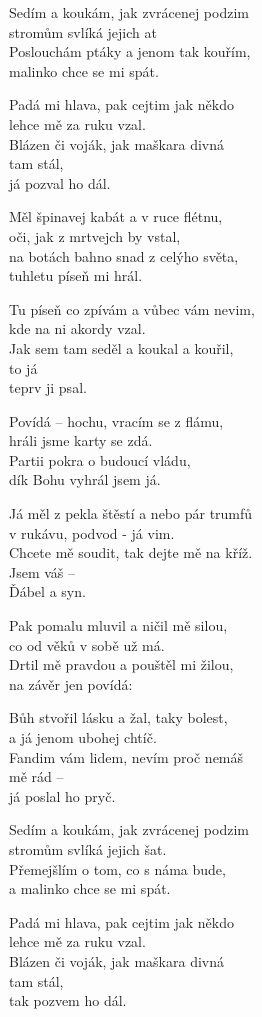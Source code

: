 
\ve{}
Sedím a koukám, jak zvrácenej podzim\\
stromům svlíká jejich at\\
Poslouchám ptáky a jenom tak kouřím,\\
malinko chce se mi spát.

\ve{}
Padá mi hlava, pak cejtim jak někdo\\
lehce mě za ruku vzal.\\
Blázen či voják, jak maškara divná\\
tam stál,\\
já pozval ho dál.

\ve{}
Měl špinavej kabát a v ruce flétnu,\\
oči, jak z mrtvejch by vstal,\\
na botách bahno snad z celýho světa,\\
tuhletu píseň mi hrál.

\ve{}
Tu píseň co zpívám a vůbec vám nevim,\\
kde na ni akordy vzal.\\
Jak sem tam seděl a koukal a kouřil,\\
to já\\
teprv ji psal.

\ve{}
Povídá -- hochu, vracím se z flámu,\\
hráli jsme karty se zdá.\\
Partii pokra o budoucí vládu,\\
dík Bohu vyhrál jsem já.

\ve{}
Já měl z pekla štěstí a nebo pár trumfů\\
v rukávu, podvod - já vim.\\
Chcete mě soudit, tak dejte mě na kříž.\\
Jsem váš --\\
Ďábel a syn.

\ve{}
Pak pomalu mluvil a ničil mě silou,\\
co od věků v sobě už má.\\
Drtil mě pravdou a pouštěl mi žilou,\\
na závěr jen povídá:

\ve{}
Bůh stvořil lásku a žal, taky bolest,\\
a já jenom ubohej chtíč.\\
Fandim vám lidem, nevím proč nemáš\\
mě rád --\\
já poslal ho pryč.

\ve{}
Sedím a koukám, jak zvrácenej podzim\\
stromům svlíká jejich šat.\\
Přemejšlím o tom, co s náma bude,\\
a malinko chce se mi spát.

\ve{}
Padá mi hlava, pak cejtim jak někdo\\
lehce mě za ruku vzal.\\
Blázen či voják, jak maškara divná\\
tam stál,\\
tak pozvem ho dál.

\esong{}